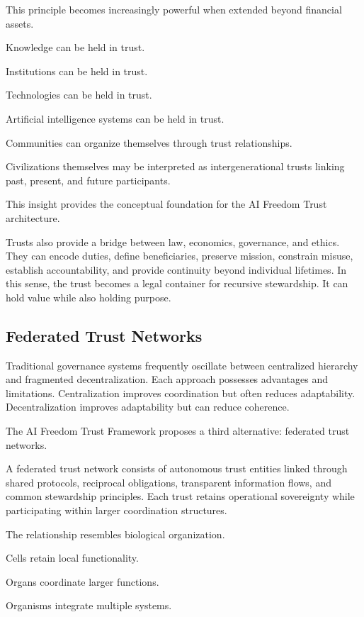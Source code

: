 \documentclass[12pt]{article}
\begin{document}
This principle becomes increasingly powerful when extended beyond financial assets.

Knowledge can be held in trust.

Institutions can be held in trust.

Technologies can be held in trust.

Artificial intelligence systems can be held in trust.

Communities can organize themselves through trust relationships.

Civilizations themselves may be interpreted as intergenerational trusts linking past, present, and future participants.

This insight provides the conceptual foundation for the AI Freedom Trust architecture.

Trusts also provide a bridge between law, economics, governance, and ethics. They can encode duties, define beneficiaries, preserve mission, constrain misuse, establish accountability, and provide continuity beyond individual lifetimes. In this sense, the trust becomes a legal container for recursive stewardship. It can hold value while also holding purpose.

\subsection{Federated Trust Networks}

Traditional governance systems frequently oscillate between centralized hierarchy and fragmented decentralization. Each approach possesses advantages and limitations. Centralization improves coordination but often reduces adaptability. Decentralization improves adaptability but can reduce coherence.

The AI Freedom Trust Framework proposes a third alternative: federated trust networks.

A federated trust network consists of autonomous trust entities linked through shared protocols, reciprocal obligations, transparent information flows, and common stewardship principles. Each trust retains operational sovereignty while participating within larger coordination structures.

The relationship resembles biological organization.

Cells retain local functionality.

Organs coordinate larger functions.

Organisms integrate multiple systems.
\end{document}
